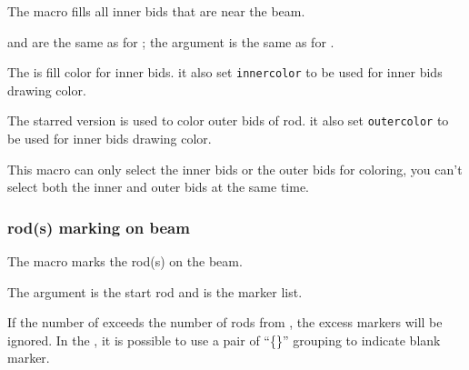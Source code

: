 \documentclass[full]{l3doc}
\begin{document}
\begin{documentation}
\begin{function}{\bids}
  \begin{syntax}
     
  \end{syntax}
\end{function}

  The  macro fills all inner bids that are near the beam.

   and  are the same as for ;
  the  argument is the same as for .

  The  is fill color for inner bids. it also set
  \texttt{innercolor} to be used for inner bids drawing color.

  The starred version  is used to color outer bids of  rod.
  it also set \texttt{outercolor} to be used for inner bids drawing color.

  \begin{noteen}
    This macro can only select the inner bids or the outer bids for coloring,
    you can't select both the inner and outer bids at the same time.
  \end{noteen}

\begin{SideBySideExample}[frame=single,numbers=left,%
    xrightmargin=.48\linewidth,gobble=2]
  \centering
  \begin{suanpan}
  \end{suanpan}
\end{SideBySideExample}

\subsubsection{ rod(s) marking on beam}

\begin{function}{\rodmark}
  \begin{syntax}
     
  \end{syntax}
\end{function}

  The  macro marks the rod(s) on the beam.

  The  argument is the start rod and 
  is the marker list.

  \begin{noteen}
    If the number of  exceeds the number of
    rods from , the excess markers will be ignored.
    In the , it is possible to use a pair of
    ``\{\}'' grouping to indicate blank marker.
  \end{noteen}


\end{documentation}
\end{document}
